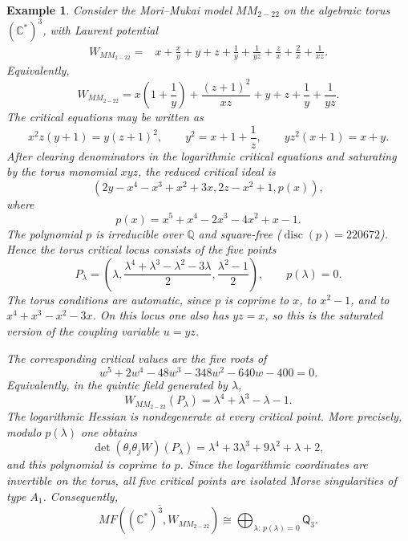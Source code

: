 \documentclass[11pt]{amsart}
\newtheorem{example}{Example}[section]
\newcommand{\MorseCat}[1]{\mathsf{Q}_{#1}}
\begin{document}
\begin{example}
Consider the Mori--Mukai model $MM_{2-22}$ on the algebraic torus
$(\mathbb{C}^*)^3$, with Laurent potential
\begin{align*}
W_{MM_{2-22}}={}&x+\frac{x}{y}+y+z+\frac{1}{y}
+\frac{1}{yz}+\frac{z}{x}+\frac{2}{x}+\frac{1}{xz}.
\end{align*}
Equivalently,
\[
W_{MM_{2-22}}
=x\left(1+\frac{1}{y}\right)
+\frac{(z+1)^2}{xz}+y+z+\frac{1}{y}+\frac{1}{yz}.
\]
The critical equations may be written as
\[
x^2z(y+1)=y(z+1)^2,
\qquad
y^2=x+1+\frac{1}{z},
\qquad
yz^2(x+1)=x+y.
\]
After clearing denominators in the logarithmic critical equations and
saturating by the torus monomial $xyz$, the reduced critical ideal is
\[
\left(
2y-x^4-x^3+x^2+3x,
2z-x^2+1,
p(x)
\right),
\]
where
\[
p(x)=x^5+x^4-2x^3-4x^2+x-1.
\]
The polynomial $p$ is irreducible over $\mathbb{Q}$ and square-free
($\operatorname{disc}(p)=220672$). Hence the torus critical locus consists of
the five points
\[
P_{\lambda}=\left(
\lambda,
\frac{\lambda^4+\lambda^3-\lambda^2-3\lambda}{2},
\frac{\lambda^2-1}{2}
\right),
\qquad
p(\lambda)=0.
\]
The torus conditions are automatic, since $p$ is coprime to $x$, to
$x^2-1$, and to $x^4+x^3-x^2-3x$. On this locus one also has
$yz=x$, so this is the saturated version of the coupling variable
$u=yz$.

The corresponding critical values are the five roots of
\[
w^5+2w^4-48w^3-348w^2-640w-400=0.
\]
Equivalently, in the quintic field generated by $\lambda$,
\[
W_{MM_{2-22}}(P_{\lambda})
=\lambda^4+\lambda^3-\lambda-1.
\]
The logarithmic Hessian is nondegenerate at every critical point. More
precisely, modulo $p(\lambda)$ one obtains
\[
\det(\theta_i\theta_jW)(P_{\lambda})
=\lambda^4+3\lambda^3+9\lambda^2+\lambda+2,
\]
and this polynomial is coprime to $p$. Since the logarithmic coordinates are
invertible on the torus, all five critical points are isolated Morse
singularities of type $A_1$. Consequently,
\[
\overline{MF((\mathbb{C}^*)^3,W_{MM_{2-22}})}
\cong \bigoplus_{\lambda:\,p(\lambda)=0}\MorseCat{3}.
\]
\end{example}
\end{document}
